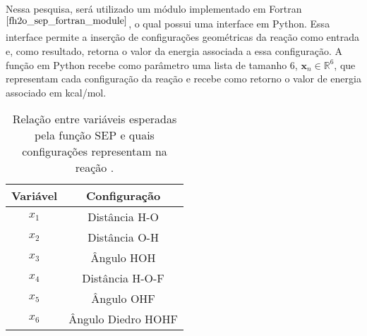 Nessa pesquisa, será utilizado um módulo implementado em Fortran$^{ \cite{fh2o_sep_fortran_module} }$, o qual possui uma interface em Python. Essa interface permite a inserção de configurações geométricas da reação  como entrada e, como resultado, retorna o valor da energia associada a essa configuração. A função em Python recebe como parâmetro uma lista de tamanho 6, $\mathbf{x}_n \in \mathds{R}^6$, que representam cada configuração da reação e recebe como retorno o valor de energia associado em kcal/mol.

\begin{table}[h]
    \centering
    \caption{Relação entre variáveis esperadas pela função SEP e quais configurações representam na reação .}
    \label{tab:configs}
    \begin{tabular}{@{}cc@{}}
    \hline
    Variável & Configuração \\
    \hline
    $x_1$ & Distância H-O \\
    $x_2$ & Distância O-H \\
    $x_3$ & Ângulo HOH \\
    $x_4$ & Distância H-O-F \\
    $x_5$ & Ângulo OHF \\
    $x_6$ & Ângulo Diedro HOHF \\
    \hline
    \end{tabular}
\end{table}
